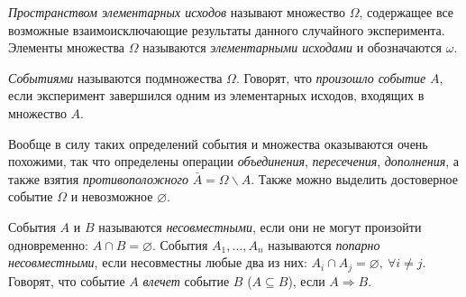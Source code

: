 \begin{to_def}
    \textit{Пространством элементарных исходов} называют множество $\Omega$, содержащее все возможные взаимоисключающие результаты данного случайного эксперимента. Элементы множества $\Omega$ называются \textit{элементарными исходами} и обозначаются $\omega$.
\end{to_def}

\begin{to_def}
    \textit{Событиями} называются подмножества $\Omega$. Говорят, что \textit{произошло событие} $A$, если эксперимент завершился одним из элементарных исходов, входящих в множество $A$. 
\end{to_def}

Вообще в силу таких определений события и множества оказываются очень похожими, так что определены операции \textit{объединения}, \textit{пересечения}, \textit{дополнения}, а также взятия \textit{противоположного} $\bar{A} = \Omega \backslash A$. Также можно выделить достоверное событие $\Omega$ и невозможное $\varnothing$. 

События $A$ и $B$ называются \textit{несовместными}, если они не могут произойти одновременно: $A \cap B = \varnothing$. События $A_1, \ldots, A_n$ называются \textit{попарно несовместными}, если несовместны любые два из них: $A_i \cap A_j = \varnothing, \ \forall i \neq j$. Говорят, что событие $A$ \textit{влечет} событие $B$ ($A \subseteq B$), если $A \Rightarrow B$. 

